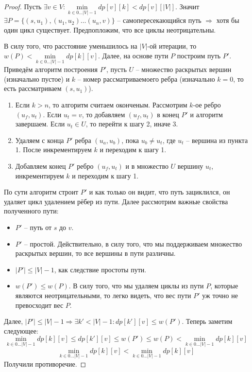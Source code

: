 \begin{proof}
    Пусть $\exists v \in V: \min\limits_{k \in 0 \dots |V| - 1} dp[v][k] < dp[v][|V|]$. Значит $\exists P = \{(s, u_1), (u_1, u_2) \dots (u_n, v)\}$ -- самопересекающийся путь $\Rightarrow$ хотя бы один цикл существует. Предпопложим, что все циклы неотрицательны.

    В силу того, что расстояние уменьшилось на $|V|$-ой итерации, то $w(P) < \min\limits_{k \in 0 \dots |V| - 1} dp[k][v]$. Далее, на основе пути $P$ построим путь $P'$. Приведём алгоритм построения $P'$, пусть $U$ -- множество раскрытых вершин (изначально пустое) и $k$ -- номер рассматриваемоего ребра (изначально $k = 0$, то есть рассматриваем $(s, u_1)$).

    \begin{enumerate}
        \item Если $k > n$, то алгоритм считаем оконченым. Рассмотрим $k$-ое ребро $(u_f, u_t)$. Если $u_t = v$, то добавляем $(u_f, u_t)$ в конец $P'$ и алгоритм завершаем. Если $u_t \in U$, то перейти к шагу 2, иначе 3.
        \item Удаляем с конца $P'$ ребра $(u_a, u_b)$, пока $u_b \neq u_t$, где $u_t$ -- вершина из пункта 1. После инкрементируем $k$ и переходим к шагу 1.
        \item Добавляем конец $P'$ ребро $(u_f, u_t)$ и в множество $U$ вершину $u_t$, инкрементируем $k$ и переходим к шагу 1.
    \end{enumerate}

    По сути алгоритм строит $P'$ и как только он видит, что путь зациклился, он удаляет цикл удалением рёбер из пути. Далее рассмотрим важные свойства полученного пути:
    \begin{itemize}
        \item $P'$ -- путь от $s$ до $v$.
        \item $P'$ -- простой. Действительно, в силу того, что мы поддерживаем множество раскрытых вершин, то все вершины в пути различны.
        \item $|P'| \leq |V| - 1$, как следствие простоты пути.
        \item $w(P') \leq w(P)$. В силу того, что мы удаляем циклы из пути $P$, которые являются неотрицательными, то легко видеть, что вес пути $P'$ уж точно не превосходит вес $P$.
    \end{itemize}
    
    Далее, $|P'| \leq |V| - 1 \Rightarrow \exists k' < |V| - 1: dp[k'][v] \leq w(P')$. Теперь заметим следующее:
    \begin{equation*}
        \min\limits_{k \in 0 \dots |V| - 1} dp[k][v] \leq dp[k'][v] \leq w(P') \leq w(P) < \min\limits_{k \in 0 \dots |V| - 1} dp[k][v]
    \end{equation*}
    \begin{equation*}
        \min\limits_{k \in 0 \dots |V| - 1} dp[k][v] < \min\limits_{k \in 0 \dots |V| - 1} dp[k][v]
    \end{equation*}
    Получили противоречие.


\end{proof}
